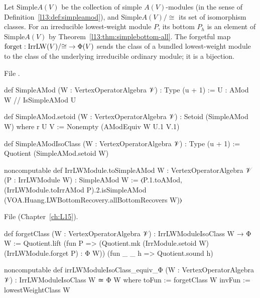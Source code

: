 \begin{definition}\label{l13:def:simpleamodclass}
Let $\mathrm{Simple}A(V)$ be the collection of simple $A(V)$-modules (in the sense of Definition~\ref{l13:def:simpleamod}),
and $\mathrm{Simple}A(V)/{\cong}$ its set of isomorphism classes. For an irreducible lowest-weight module $P$, its bottom
$P_h$ is an element of $\mathrm{Simple}A(V)$ by Theorem~\ref{l13:thm:simplebottom-all}. The forgetful map
$\mathrm{forget}:\mathrm{Irr}\mathrm{LW}(V)/{\cong}\to\Phi(V)$ sends the class of a bundled lowest-weight module to the class of
the underlying irreducible ordinary module; it is a bijection.
\end{definition}
\noindent File .
\begin{leancode}
def SimpleAMod (W : VertexOperatorAlgebra 𝒱) : Type (u + 1) :=
  {U : AMod W // IsSimpleAMod U}

def SimpleAMod.setoid (W : VertexOperatorAlgebra 𝒱) : Setoid (SimpleAMod W) where
  r U V := Nonempty (AModEquiv W U.1 V.1)

def SimpleAModIsoClass (W : VertexOperatorAlgebra 𝒱) : Type (u + 1) :=
  Quotient (SimpleAMod.setoid W)

noncomputable def IrrLWModule.toSimpleAMod {W : VertexOperatorAlgebra 𝒱} (P : IrrLWModule W) :
    SimpleAMod W :=
  ⟨P.1.toAMod,
    (IrrLWModule.toIrrAMod P).2.isSimpleAMod (VOA.Huang.LWBottomRecovery.allBottomRecovers W)⟩
\end{leancode}
\noindent File  (Chapter~\ref{ch:L15}).
\begin{leancode}
def forgetClass (W : VertexOperatorAlgebra 𝒱) : IrrLWModuleIsoClass W → Φ W :=
  Quotient.lift (fun P => (Quotient.mk (IrrModule.setoid W) (IrrLWModule.forget P) : Φ W))
    (fun _ _ h => Quotient.sound h)

noncomputable def irrLWModuleIsoClass_equiv_Φ (W : VertexOperatorAlgebra 𝒱) :
    IrrLWModuleIsoClass W ≃ Φ W where
  toFun := forgetClass W
  invFun := lowestWeightClass W
\end{leancode}

